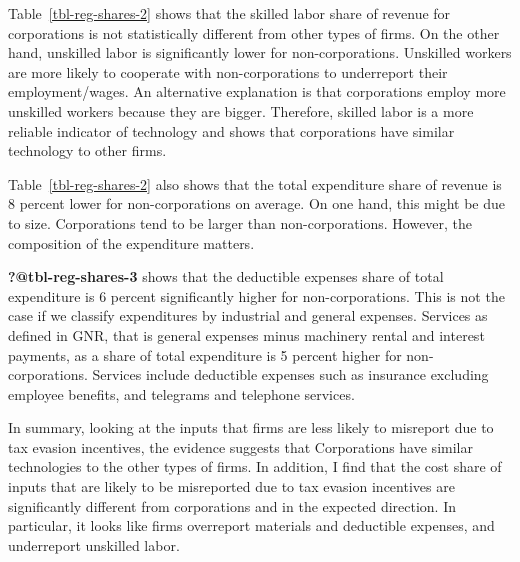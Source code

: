 \documentclass[
  12pt]{article}
\theoremstyle{definition}
\theoremstyle{remark}
\begin{document}
Table~\ref{tbl-reg-shares-2} shows that the skilled labor share of
revenue for corporations is not statistically different from other types
of firms. On the other hand, unskilled labor is significantly lower for
non-corporations. Unskilled workers are more likely to cooperate with
non-corporations to underreport their employment/wages. An alternative
explanation is that corporations employ more unskilled workers because
they are bigger. Therefore, skilled labor is a more reliable indicator
of technology and shows that corporations have similar technology to
other firms.

Table~\ref{tbl-reg-shares-2} also shows that the total expenditure share
of revenue is 8 percent lower for non-corporations on average. On one
hand, this might be due to size. Corporations tend to be larger than
non-corporations. However, the composition of the expenditure matters.

\textbf{?@tbl-reg-shares-3} shows that the deductible expenses share of
total expenditure is 6 percent significantly higher for
non-corporations. This is not the case if we classify expenditures by
industrial and general expenses. Services as defined in GNR, that is
general expenses minus machinery rental and interest payments, as a
share of total expenditure is 5 percent higher for non-corporations.
Services include deductible expenses such as insurance excluding
employee benefits, and telegrams and telephone services.

In summary, looking at the inputs that firms are less likely to
misreport due to tax evasion incentives, the evidence suggests that
Corporations have similar technologies to the other types of firms. In
addition, I find that the cost share of inputs that are likely to be
misreported due to tax evasion incentives are significantly different
from corporations and in the expected direction. In particular, it looks
like firms overreport materials and deductible expenses, and underreport
unskilled labor.
\end{document}
